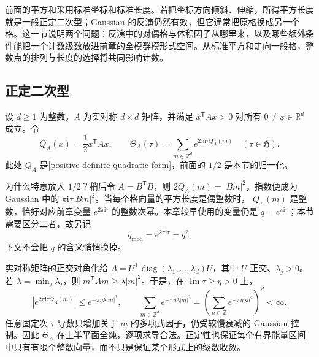 
前面的平方和采用标准坐标和标准长度。若把坐标方向倾斜、伸缩，所得平方长度就是一般正定二次型；Gaussian 的反演仍然有效，但它通常把原格换成另一个格。这一节说明两个问题：反演中的对偶格与体积因子从哪里来，以及哪些额外条件能把一个计数级数放进前章的全模群模形式空间。从标准平方和走向一般格，整数点的排列与长度的选择将共同影响计数。

\subsection{正定二次型}
\label{b3:subsec:240501}

\begin{definition}\label{b3:def:24-quadratic-theta}
设 \(d\ge1\) 为整数，\(A\) 为实对称 \(d\times d\) 矩阵，并满足
\(x^{\mathsf T}Ax>0\) 对所有 \(0\ne x\in\mathbb R^d\) 成立。令
\[
 Q_A(x)=\frac12x^{\mathsf T}Ax,\qquad
 \Theta_A(\tau)=\sum_{m\in\mathbb Z^d}e^{2\pi\mathrm{i}\tau Q_A(m)}
 \quad(\tau\in\mathfrak H).
\]
此处 \(Q_A\) 是[positive definite quadratic form]，前面的 \(1/2\) 是本节的归一化。
\end{definition}

为什么特意放入 \(1/2\)？稍后令 \(A=B^{\mathsf T}B\)，则
\(2Q_A(m)=|Bm|^2\)，指数便成为 Gaussian 中的
\(\pi\mathrm{i}\tau|Bm|^2\)。当每个格向量的平方长度是偶整数时，
\(Q_A(m)\) 是整数，恰好对应前章变量 \(e^{2\pi\mathrm{i}\tau}\) 的整数次幂。本章较早使用的变量仍是 \(q=e^{\pi\mathrm{i}\tau}\)；本节需要区分二者，故另记
\[
 q_{\mathrm{mod}}=e^{2\pi\mathrm{i}\tau}=q^2.
\]
下文不会把 \(q\) 的含义悄悄换掉。

\ProseParagraphBreak

实对称矩阵的正交对角化给
\(A=U^{\mathsf T}\operatorname{diag}(\lambda_1,\ldots,\lambda_d)U\)，其中
\(U\) 正交、\(\lambda_j>0\)。若 \(\lambda=\min_j\lambda_j\)，则
\(m^{\mathsf T}Am\ge\lambda|m|^2\)。于是，在
\(\operatorname{Im}\tau\ge\eta>0\) 上，
\[
 \left|e^{2\pi\mathrm{i}\tau Q_A(m)}\right|
 \le e^{-\pi\eta\lambda|m|^2},\qquad
 \sum_{m\in\mathbb Z^d}e^{-\pi\eta\lambda|m|^2}
 =\left(\sum_{n\in\mathbb Z}e^{-\pi\eta\lambda n^2}\right)^d<\infty.
\]
任意固定次 \(\tau\) 导数只增加关于 \(m\) 的多项式因子，仍受较慢衰减的 Gaussian 控制。因此 \(\Theta_A\) 在上半平面全纯，逐项求导合法。正定性也保证每个有界能量区间中只有有限个整数向量，而不只是保证某个形式上的级数收敛。

